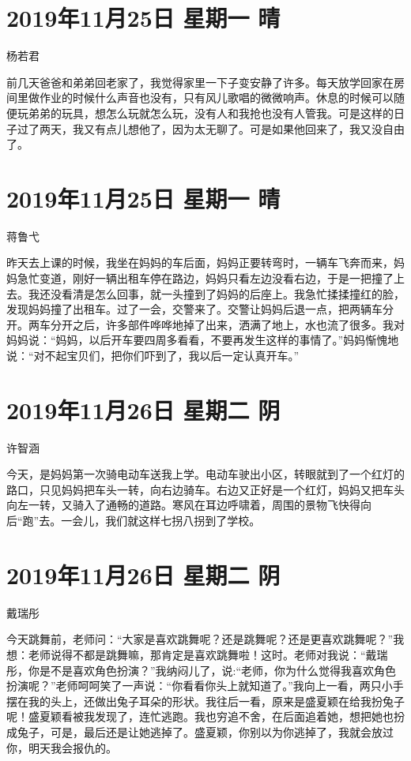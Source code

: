 \section{2019年11月25日 星期一 晴}

杨若君

前几天爸爸和弟弟回老家了，我觉得家里一下子变安静了许多。每天放学回家在房间里做作业的时候什么声音也没有，只有风儿歌唱的微微响声。休息的时候可以随便玩弟弟的玩具，想怎么玩就怎么玩，没有人和我抢也没有人管我。可是这样的日子过了两天，我又有点儿想他了，因为太无聊了。可是如果他回来了，我又没自由了。

\section{2019年11月25日 星期一 晴}

蒋鲁弋

昨天去上课的时候，我坐在妈妈的车后面，妈妈正要转弯时，一辆车飞奔而来，妈妈急忙变道，刚好一辆出租车停在路边，妈妈只看左边没看右边，于是一把撞了上去。我还没看清是怎么回事，就一头撞到了妈妈的后座上。我急忙揉揉撞红的脸，发现妈妈撞了出租车。过了一会，交警来了。交警让妈妈后退一点，把两辆车分开。两车分开之后，许多部件哗哗地掉了出来，洒满了地上，水也流了很多。我对妈妈说：“妈妈，以后开车要四周多看看，不要再发生这样的事情了。”妈妈惭愧地说：“对不起宝贝们，把你们吓到了，我以后一定认真开车。”

\section{2019年11月26日 星期二 阴}

许智涵

今天，是妈妈第一次骑电动车送我上学。电动车驶出小区，转眼就到了一个红灯的路口，只见妈妈把车头一转，向右边骑车。右边又正好是一个红灯，妈妈又把车头向左一转，又骑入了通畅的道路。寒风在耳边呼啸着，周围的景物飞快得向后“跑”去。一会儿，我们就这样七拐八拐到了学校。

\section{2019年11月26日 星期二 阴}

戴瑞彤

今天跳舞前，老师问：“大家是喜欢跳舞呢？还是跳舞呢？还是更喜欢跳舞呢？”我想：老师说得不都是跳舞嘛，那肯定是喜欢跳舞啦！这时。老师对我说：“戴瑞彤，你是不是喜欢角色扮演？”我纳闷儿了，说:“老师，你为什么觉得我喜欢角色扮演呢？”老师呵呵笑了一声说：“你看看你头上就知道了。”我向上一看，两只小手摆在我的头上，还做出兔子耳朵的形状。我往后一看，原来是盛夏颖在给我扮兔子呢！盛夏颖看被我发现了，连忙逃跑。我也穷追不舍，在后面追着她，想把她也扮成兔子，可是，最后还是让她逃掉了。盛夏颖，你别以为你逃掉了，我就会放过你，明天我会报仇的。

